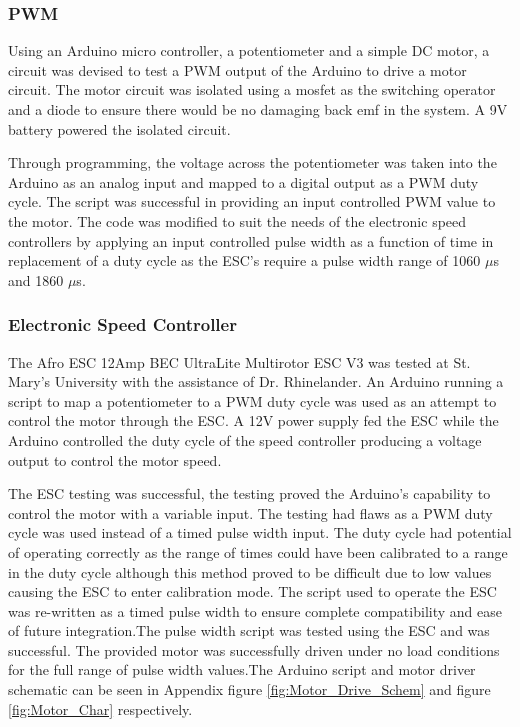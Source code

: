   \subsubsection{PWM}
  
Using an Arduino micro controller, a potentiometer and a simple DC motor, a circuit was devised to test a PWM output of the Arduino to drive a motor circuit. The motor circuit was isolated using a mosfet as the switching operator and a diode to ensure there would be no damaging back emf in the system. A 9V battery powered the isolated circuit.
  
Through programming, the voltage across the potentiometer was taken into the Arduino as an analog input and mapped to a digital output as a PWM duty cycle. The script was successful in providing an input controlled PWM value to the motor. The code was modified to suit the needs of the electronic speed controllers by applying an input controlled pulse width as a function of time in replacement of a duty cycle as the ESC's require a pulse width range of 1060 $\mu$s and 1860 $\mu$s.

  
  \subsubsection{Electronic Speed Controller}
  
The Afro ESC 12Amp BEC UltraLite Multirotor ESC V3 was tested at St. Mary's University with the assistance of Dr. Rhinelander. An Arduino running a script to map a potentiometer to a PWM duty cycle was used as an attempt to control the motor through the ESC. A 12V power supply fed the ESC while the Arduino controlled the duty cycle of the speed controller producing a voltage output to control the motor speed. 

The ESC testing was successful, the testing proved the Arduino's capability to control the motor with a variable input. The testing had flaws as a PWM duty cycle was used instead of a timed pulse width input. The duty cycle had potential of operating correctly as the range of times could have been calibrated to a range in the duty cycle although this method proved to be difficult due to low values causing the ESC to enter calibration mode. The script used to operate the ESC was re-written as a timed pulse width to ensure complete compatibility and ease of future integration.The pulse width script was tested using the ESC and was successful. The provided motor was successfully driven under no load conditions for the full range of pulse width values.The Arduino script and motor driver schematic can be seen in Appendix figure \ref{fig:Motor_Drive_Schem} and figure \ref{fig:Motor_Char} respectively.

